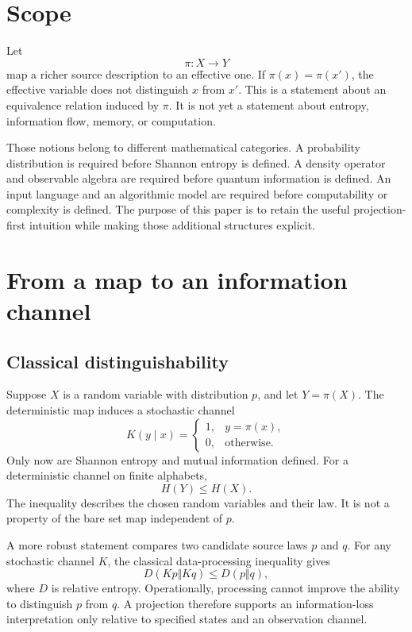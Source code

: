 \documentclass[11pt]{article}
\begin{document}
\tableofcontents

\section{Scope}

Let
\[
 \pi:X\longrightarrow Y
\]
map a richer source description to an effective one. If
\(\pi(x)=\pi(x')\), the effective variable does not distinguish \(x\) from
\(x'\). This is a statement about an equivalence relation induced by
\(\pi\). It is not yet a statement about entropy, information flow, memory,
or computation.

Those notions belong to different mathematical categories. A probability
distribution is required before Shannon entropy is defined. A density
operator and observable algebra are required before quantum information is
defined. An input language and an algorithmic model are required before
computability or complexity is defined. The purpose of this paper is to
retain the useful projection-first intuition while making those additional
structures explicit.

\section{From a map to an information channel}

\subsection{Classical distinguishability}

Suppose \(X\) is a random variable with distribution \(p\), and let
\(Y=\pi(X)\). The deterministic map induces a stochastic channel
\[
 K(y\mid x)=
 \begin{cases}
 1,&y=\pi(x),\\
 0,&\text{otherwise}.
 \end{cases}
\]
Only now are Shannon entropy and mutual information defined. For a
deterministic channel on finite alphabets,
\[
 H(Y)\leq H(X).
\]
The inequality describes the chosen random variables and their law. It is
not a property of the bare set map independent of \(p\).

A more robust statement compares two candidate source laws \(p\) and \(q\).
For any stochastic channel \(K\), the classical data-processing inequality
gives
\[
 D(Kp\Vert Kq)\leq D(p\Vert q),
\]
where \(D\) is relative entropy. Operationally, processing cannot improve
the ability to distinguish \(p\) from \(q\). A projection therefore supports
an information-loss interpretation only relative to specified states and
an observation channel.
\end{document}
